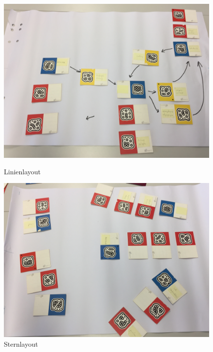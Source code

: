\begin{figure}[h]
	\centering 
	\begin{minipage}[b]{0.45\textwidth} 
		\includegraphics[width=\textwidth]{figures/03.jpg}
		\caption{Linienlayout \protect~\cite{max}} 
		\label{fig:subjekt-position} 
	\end{minipage}
	\hfill 
	\begin{minipage}[b]{0.45\textwidth} 
		\includegraphics[width=\textwidth]{figures/17.jpg} 		
		\caption{Sternlayout \protect~\cite{max}} 
		\label{fig:nicht-vertikal} 
	\end{minipage}
\end{figure}


